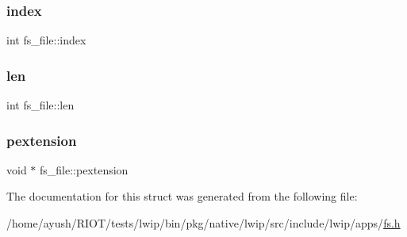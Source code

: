 \mbox{\label{structfs__file_af27b72371512e6cbf6104bc3a7063aab}} 
\subsubsection{\texorpdfstring{index}{index}}
{\footnotesize\ttfamily int fs\+\_\+file\+::index}

\mbox{\label{structfs__file_a99a16a5082bf9510cb1cb8069402f1f0}} 
\subsubsection{\texorpdfstring{len}{len}}
{\footnotesize\ttfamily int fs\+\_\+file\+::len}

\mbox{\label{structfs__file_ac8c7eb661338414025e5ed8ff3153df5}} 
\subsubsection{\texorpdfstring{pextension}{pextension}}
{\footnotesize\ttfamily void $\ast$ fs\+\_\+file\+::pextension}



The documentation for this struct was generated from the following file\+:\begin{DoxyCompactItemize}
\item 
/home/ayush/\+R\+I\+O\+T/tests/lwip/bin/pkg/native/lwip/src/include/lwip/apps/\hyperlink{native_2lwip_2src_2include_2lwip_2apps_2fs_8h}{fs.\+h}\end{DoxyCompactItemize}
